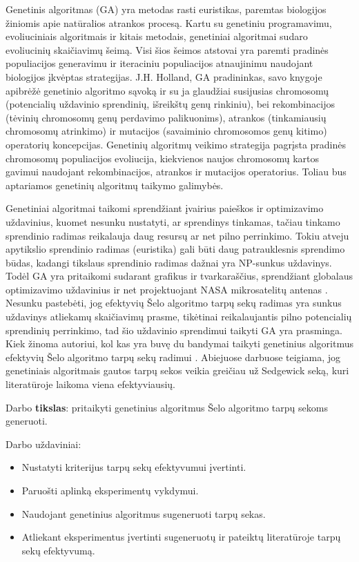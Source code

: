 \documentclass{VUMIFInfKursinis}
\begin{document}
Genetinis algoritmas (GA) yra metodas rasti euristikas, paremtas biologijos žiniomis apie natūralios atrankos procesą.
Kartu su genetiniu programavimu, evoliuciniais algoritmais ir kitais metodais, %
genetiniai algoritmai sudaro evoliucinių skaičiavimų šeimą.
Visi šios šeimos atstovai yra paremti pradinės populiacijos generavimu ir iteraciniu populiacijos atnaujinimu naudojant biologijos įkvėptas strategijas.
J.H. Holland, GA pradininkas, savo knygoje \cite{holland1992adaptation}
apibrėžė genetinio algoritmo sąvoką ir su ja glaudžiai susijusias
chromosomų (potencialių uždavinio sprendinių, išreikštų genų rinkiniu), bei
rekombinacijos (tėvinių chromosomų genų perdavimo palikuonims),
atrankos (tinkamiausių chromosomų atrinkimo) ir mutacijos (savaiminio chromosomos genų kitimo) operatorių koncepcijas.
Genetinių algoritmų veikimo strategija pagrįsta pradinės chromosomų populiacijos evoliucija, kiekvienos naujos chromosomų kartos
gavimui naudojant rekombinacijos, atrankos ir mutacijos operatorius.
Toliau bus aptariamos genetinių algoritmų taikymo galimybės.

Genetiniai algoritmai taikomi sprendžiant įvairius paieškos ir optimizavimo uždavinius, kuomet nesunku nustatyti, ar sprendinys tinkamas,
tačiau tinkamo sprendinio radimas reikalauja daug resursų ar net pilno perrinkimo.
Tokiu atveju apytikslio sprendinio radimas (euristika) gali būti daug patrauklesnis sprendimo būdas,
kadangi tikslaus sprendinio radimas dažnai yra NP-sunkus uždavinys.
Todėl GA yra pritaikomi sudarant grafikus ir tvarkaraščius,
sprendžiant globalaus optimizavimo uždavinius
ir net projektuojant NASA mikrosatelitų antenas \cite{hornby2006automated}.
Nesunku pastebėti, jog efektyvių Šelo algoritmo tarpų sekų radimas yra sunkus uždavinys atliekamų skaičiavimų prasme,
tikėtinai reikalaujantis pilno potencialių sprendinių perrinkimo,
tad šio uždavinio sprendimui taikyti GA yra prasminga.
Kiek žinoma autoriui, kol kas yra buvę du bandymai taikyti genetinius algoritmus efektyvių Šelo algoritmo tarpų sekų radimui \cite{simpson1999faster} \cite{roos2002genetic}.
Abiejuose darbuose teigiama, jog genetiniais algoritmais gautos tarpų sekos veikia greičiau už Sedgewick seką, kuri literatūroje laikoma viena efektyviausių.

\pagebreak

Darbo \textbf{tikslas}:
pritaikyti genetinius algoritmus Šelo algoritmo tarpų sekoms generuoti.

Darbo uždaviniai:
\begin{itemize}
  \item Nustatyti kriterijus tarpų sekų efektyvumui įvertinti.
  \item Paruošti aplinką eksperimentų vykdymui.
  \item Naudojant genetinius algoritmus sugeneruoti tarpų sekas.
  \item Atliekant eksperimentus įvertinti sugeneruotų ir pateiktų literatūroje tarpų sekų efektyvumą.
\end{itemize}
\end{document}
